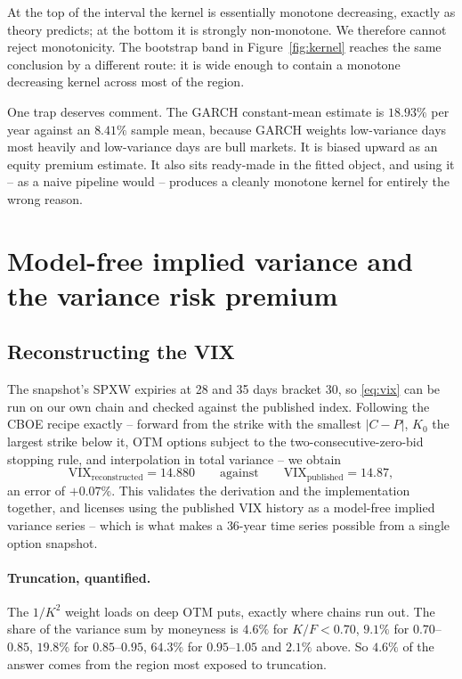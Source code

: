 \documentclass[11pt,a4paper]{article}
\theoremstyle{remark}
\begin{document}
At the top of the interval the kernel is essentially monotone decreasing,
exactly as theory predicts; at the bottom it is strongly non-monotone. We
therefore cannot reject monotonicity. The bootstrap band in
Figure~\ref{fig:kernel} reaches the same conclusion by a different route: it is
wide enough to contain a monotone decreasing kernel across most of the region.

One trap deserves comment. The GARCH constant-mean estimate is $18.93\%$ per
year against an $8.41\%$ sample mean, because GARCH weights low-variance days
most heavily and low-variance days are bull markets. It is biased upward as an
equity premium estimate. It also sits ready-made in the fitted object, and
using it -- as a naive pipeline would -- produces a cleanly monotone kernel for
entirely the wrong reason.

\section{Model-free implied variance and the variance risk premium}
\label{sec:vrp}

\subsection{Reconstructing the VIX}

The snapshot's SPXW expiries at 28 and 35 days bracket 30, so \eqref{eq:vix}
can be run on our own chain and checked against the published index. Following
the CBOE recipe exactly -- forward from the strike with the smallest $|C-P|$,
$K_0$ the largest strike below it, OTM options subject to the
two-consecutive-zero-bid stopping rule, and interpolation in total variance --
we obtain
\[
\text{VIX}_{\text{reconstructed}} = 14.880
\qquad\text{against}\qquad
\text{VIX}_{\text{published}} = 14.87,
\]
an error of $+0.07\%$. This validates the derivation and the implementation
together, and licenses using the published VIX history as a model-free implied
variance series -- which is what makes a 36-year time series possible from a
single option snapshot.

\paragraph{Truncation, quantified.} The $1/K^2$ weight loads on deep OTM puts,
exactly where chains run out. The share of the variance sum by moneyness is
$4.6\%$ for $K/F<0.70$, $9.1\%$ for $0.70$--$0.85$, $19.8\%$ for
$0.85$--$0.95$, $64.3\%$ for $0.95$--$1.05$ and $2.1\%$ above. So $4.6\%$ of
the answer comes from the region most exposed to truncation.
\end{document}
